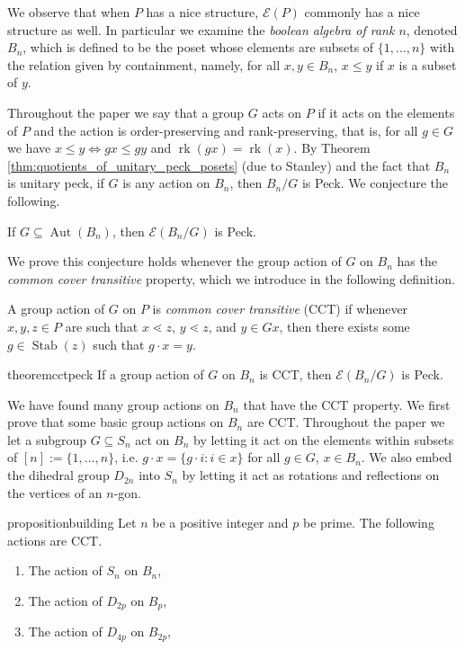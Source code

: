 \documentclass[smallextended, envcountsame, numbook]{svjour3}
\numberwithin{equation}{section}
\renewcommand{\iff}{\Leftrightarrow}
\newcommand\rk{\operatorname{rk}}
\newcommand\Stab{\operatorname{Stab}}
\newcommand\Aut{\operatorname{Aut}}
\begin{document}
We observe that when $P$ has a nice structure, $\mathcal E(P)$ commonly has a nice structure as well.  In particular we examine the \textit{boolean algebra of rank $n$}, denoted $B_n$, which is defined to be the poset whose elements are subsets of $\{1,\ldots,n\}$ with the relation given by containment, namely, for all $x,y\in B_n$, $x\le y$ if $x$ is a subset of $y$.

Throughout the paper we say that a group $G$ acts on $P$ if it acts on the elements of $P$ and the action is order-preserving and rank-preserving, that is, for all $g \in G$ we have $x \leq y \iff gx \leq gy$ and $\rk(gx) = \rk(x)$.  By Theorem \ref{thm:quotients_of_unitary_peck_posets} (due to Stanley) and the fact that $B_n$ is unitary peck, if $G$ is any action on $B_n$, then $B_n/G$ is Peck.  We conjecture the following.

\begin{conjecture}\label{conj:F_of_BnG_Peck}
If $G \subseteq \Aut(B_n)$, then $\mathcal E(B_n/G)$ is Peck.
\end{conjecture}

We prove this conjecture holds whenever the group action of $G$ on $B_n$ has the \emph{common cover transitive} property, which we introduce in the following definition.

\begin{definition}
\label{defn:cover_transitive}
A group action of $G$ on $P$ is \textit{common cover transitive} (CCT) if whenever $x,y,z\in P$ are such that $x\lessdot z$, $y\lessdot z$, and $y\in Gx$, then there exists some $g\in \Stab(z)$ such that $g\cdot x = y$.
\end{definition}

\begin{restatable}{theorem}{cctpeck}
\label{thm:cover_transitive_implies_Peck}
If a group action of $G$ on $B_n$ is CCT, then $\mathcal E(B_n/G)$ is Peck.
\end{restatable}

We have found many group actions on $B_n$ that have the CCT property.  We first prove that some basic group actions on $B_n$ are CCT.  Throughout the paper we let a subgroup $G\subseteq S_n$ act on $B_n$ by letting it act on the elements within subsets of $[n]:= \{1,\ldots, n\}$, i.e. $g\cdot x = \{g\cdot i\colon i\in x\}$  for all $g\in G$, $x\in B_n$.  We also embed the dihedral group $D_{2n}$ into $S_n$ by letting it act as rotations and reflections on the vertices of an $n$-gon.

\begin{restatable}{proposition}{building}
\label{prop:cover_transitive_building_blocks}
 Let $n$ be a positive integer and $p$ be prime.  The following actions are CCT.
\begin{enumerate}
\item The action of $S_n$ on $B_n$,
\item The action of $D_{2p}$ on $B_p$,
\item The action of $D_{4p}$ on $B_{2p}$,
\end{enumerate} 
\end{restatable}
\end{document}
